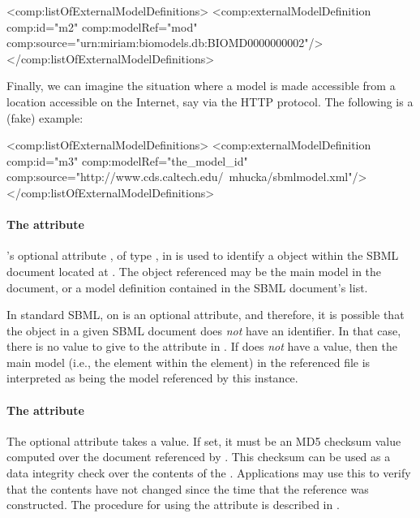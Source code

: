 \begin{example}
<comp:listOfExternalModelDefinitions>
    <comp:externalModelDefinition comp:id="m2" comp:modelRef="mod"
                                  comp:source="urn:miriam:biomodels.db:BIOMD0000000002"/>
</comp:listOfExternalModelDefinitions>
\end{example}

Finally, we can imagine the situation where a model is made accessible
from a location accessible on the Internet, say via the HTTP protocol.
The following is a (fake) example:

\begin{example}
<comp:listOfExternalModelDefinitions>
    <comp:externalModelDefinition comp:id="m3" comp:modelRef="the_model_id"
                                  comp:source="http://www.cds.caltech.edu/~mhucka/sbmlmodel.xml"/>
</comp:listOfExternalModelDefinitions>
\end{example}



\paragraph{The \fixttspace{} attribute}

\ExternalModelDefinition's optional attribute , of type
, in is used to identify a \Model object within the
SBML document located at .  The object referenced may be
the main model in the document, or a model definition contained in the
SBML document's  list.

In standard SBML,  on \Model is an optional attribute, and
therefore, it is possible that the \Model object in a given SBML
document does \emph{not} have an identifier.  In that case, there is no
value to give to the  attribute in
\ExternalModelDefinition.  If  does \emph{not} have a
value, then the main model (i.e., the  element within the
 element) in the referenced file is interpreted as being
the model referenced by this \ExternalModelDefinition instance.


\paragraph{The \fixttspace{} attribute}

The optional  attribute takes a  value.  If
set, it must be an MD5 checksum value computed over the document
referenced by .  This checksum can be used as a data integrity
check over the contents of the .  Applications may use
this to verify that the contents have not changed since the time that
the \ExternalModelDefinition reference was constructed.  The procedure
for using the  attribute is described in
.

